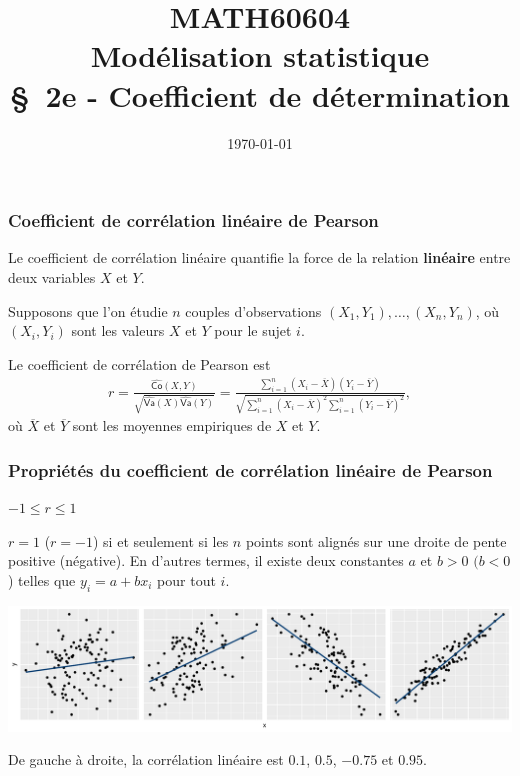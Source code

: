 \documentclass[xcolor={dvipsnames}]{beamer}
\title[\color{white}{MATH60604 \S~2e - Coefficient de détermination}]{MATH60604 \\Modélisation statistique \\ \S~2e - Coefficient de détermination}
\author{}
\date{\today}
\institute{HEC Montréal\\
Département de sciences de la décision}
\date{}
\begin{document}
\frame{\titlepage}


\begin{frame}
\frametitle{Coefficient de corrélation linéaire de Pearson}
\bi
\item Le coefficient de corrélation linéaire \alert{quantifie} la force de la relation \textbf{linéaire} entre deux variables $X$ et $Y$. 
\item Supposons que l’on étudie $n$ couples d’observations $(X_1, Y_1),\ldots,(X_n, Y_n)$, où $(X_i, Y_i)$ sont les valeurs $X$ et $Y$ pour le sujet $i$.
\item Le coefficient de corrélation de Pearson est
\begin{align*}
r=\frac{\widehat{\mathsf{Co}}(X,Y)}{\sqrt{\widehat{\mathsf{Va}}(X)\widehat{\mathsf{Va}}(Y)}} =\frac{\sum_{i=1}^n (X_i-\overline{X})(Y_i-\overline{Y})}{\sqrt{\sum_{i=1}^n(X_i-\overline{X})^2 \sum_{i=1}^n (Y_i-\overline{Y})^2}},\end{align*}
où $\overline{X}$ et $\overline{Y}$ sont les moyennes empiriques de $X$ et $Y$.
\ei
\end{frame}

\begin{frame}
\frametitle{Propriétés du coefficient de corrélation linéaire de Pearson}
\begin{tcolorbox}[colback=lightgray!30!white, colframe=lightgray!75!black, title=Propriétés du coefficient de corrélation linéaire de Pearson]
\bi
\item $-1 \leq r \leq 1$
\item $r=1$ ($r=-1$)  si et seulement si les $n$ points sont alignés sur une droite de pente positive (négative). En d'autres termes, il existe deux constantes $a$ et $b > 0$ $(b <0$) telles que $y_i=a+b x_i$ pour tout $i$.
\ei
\end{tcolorbox}
 \begin{center}
  \includegraphics[width = \textwidth]{img/c2/03-linreg-correlation}
 \end{center}
{\footnotesize 
De gauche à droite, la corrélation linéaire est $0.1$, $0.5$, $-0.75$ et $0.95$.


}
 
\end{frame}
\end{document}
